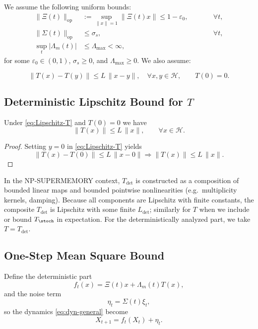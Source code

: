 \documentclass[11pt]{article}
\begin{document}
We assume the following uniform bounds:
\begin{align}
\|\Xi(t)\|_{\mathrm{op}} &:= \sup_{\|x\|=1} \|\Xi(t)x\| \le 1 - \varepsilon_0,\qquad &&\forall t,\label{eq:bound-xi}\\
\|\Sigma(t)\|_{\mathrm{op}} &\le \sigma_s,\qquad &&\forall t,\label{eq:bound-sigma}\\
\sup_t |\Lambda_m(t)| &\le \Lambda_{\max} < \infty,\label{eq:bound-lambda}
\end{align}
for some $\varepsilon_0\in(0,1)$, $\sigma_s\ge 0$, and $\Lambda_{\max}\ge 0$. We also assume:

\begin{equation}
\|T(x) - T(y)\|\le L\,\|x-y\|,\quad \forall x,y\in\mathcal{H},\qquad T(0)=0.
\label{eq:Lipschitz-T}
\end{equation}

\subsection{Deterministic Lipschitz Bound for $T$}

\begin{lemma}
Under \eqref{eq:Lipschitz-T} and $T(0)=0$ we have
\[
\|T(x)\| \le L\,\|x\|,\qquad \forall x\in\mathcal{H}.
\]
\end{lemma}

\begin{proof}
Setting $y=0$ in \eqref{eq:Lipschitz-T} yields
\[
\|T(x) - T(0)\| \le L\,\|x-0\| \Rightarrow \|T(x)\|\le L\,\|x\|.
\]
\end{proof}

In the NP-SUPERMEMORY context, $T_{\det}$ is constructed as a composition of bounded linear maps and bounded pointwise nonlinearities (e.g.\ multiplicity kernels, damping). Because all components are Lipschitz with finite constants, the composite $T_{\det}$ is Lipschitz with some finite $L_{\det}$; similarly for $T$ when we include or bound $T_{\stoch}$ in expectation. For the deterministically analyzed part, we take $T=T_{\det}$.

\subsection{One-Step Mean Square Bound}

Define the deterministic part
\[
f_t(x) = \Xi(t)x + \Lambda_m(t)T(x),
\]
and the noise term
\[
\eta_t = \Sigma(t)\xi_t,
\]
so the dynamics \eqref{eq:dyn-general} become
\[
X_{t+1} = f_t(X_t) + \eta_t.
\]
\end{document}
